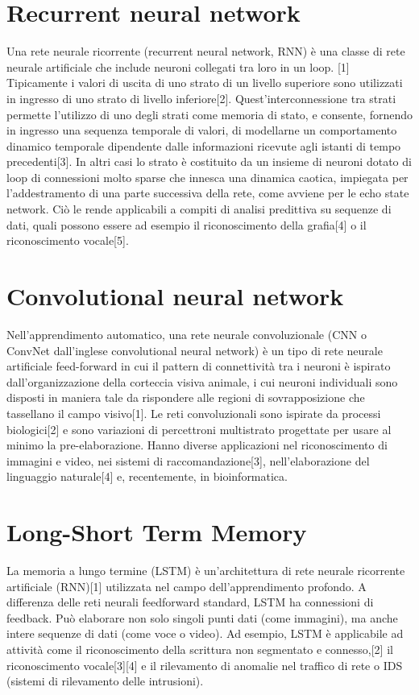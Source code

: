 \documentclass[12pt,a4paper]{report}
\begin{document}
\section*{Recurrent neural network}
Una rete neurale ricorrente (recurrent neural network, RNN) è una classe di rete neurale artificiale che include neuroni collegati tra loro in un loop. [1] Tipicamente i valori di uscita di uno strato di un livello superiore sono utilizzati in ingresso di uno strato di livello inferiore[2]. Quest'interconnessione tra strati permette l'utilizzo di uno degli strati come memoria di stato, e consente, fornendo in ingresso una sequenza temporale di valori, di modellarne un comportamento dinamico temporale dipendente dalle informazioni ricevute agli istanti di tempo precedenti[3]. In altri casi lo strato è costituito da un insieme di neuroni dotato di loop di connessioni molto sparse che innesca una dinamica caotica, impiegata per l'addestramento di una parte successiva della rete, come avviene per le echo state network. Ciò le rende applicabili a compiti di analisi predittiva su sequenze di dati, quali possono essere ad esempio il riconoscimento della grafia[4] o il riconoscimento vocale[5].

\section*{Convolutional neural network}
Nell'apprendimento automatico, una rete neurale convoluzionale (CNN o ConvNet dall'inglese convolutional neural network) è un tipo di rete neurale artificiale feed-forward in cui il pattern di connettività tra i neuroni è ispirato dall'organizzazione della corteccia visiva animale, i cui neuroni individuali sono disposti in maniera tale da rispondere alle regioni di sovrapposizione che tassellano il campo visivo[1]. Le reti convoluzionali sono ispirate da processi biologici[2] e sono variazioni di percettroni multistrato progettate per usare al minimo la pre-elaborazione. Hanno diverse applicazioni nel riconoscimento di immagini e video, nei sistemi di raccomandazione[3], nell'elaborazione del linguaggio naturale[4] e, recentemente, in bioinformatica.
    
\section*{Long-Short Term Memory}
La memoria a lungo termine (LSTM) è un'architettura di rete neurale ricorrente artificiale (RNN)[1] utilizzata nel campo dell'apprendimento profondo. A differenza delle reti neurali feedforward standard, LSTM ha connessioni di feedback. Può elaborare non solo singoli punti dati (come immagini), ma anche intere sequenze di dati (come voce o video). Ad esempio, LSTM è applicabile ad attività come il riconoscimento della scrittura non segmentato e connesso,[2] il riconoscimento vocale[3][4] e il rilevamento di anomalie nel traffico di rete o IDS (sistemi di rilevamento delle intrusioni).


\clearpage



 
\end{document}
